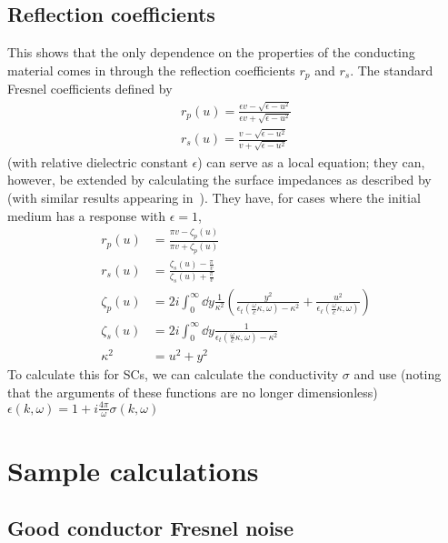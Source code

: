 \documentclass[../main.tex]{subfiles}
\begin{document}
	\subsection{Reflection coefficients} \label{subsec:ReflectionCoeffs}
	This shows that the only dependence on the properties of the conducting material comes in through the reflection coefficients $r_p$ and $r_s$.
	The standard Fresnel coefficients defined by
	\begin{align}
		r_p(u) = \frac{\epsilon v - \sqrt{\epsilon - u^2}}{\epsilon v + \sqrt{\epsilon - u^2}} \\
		r_s(u) = \frac{v - \sqrt{\epsilon - u^2}}{v + \sqrt{\epsilon - u^2}}
	\end{align}
	(with relative dielectric constant $\epsilon$) can serve as a local equation;
	they can, however, be extended by calculating the surface impedances as described by~\cite{Ford1984} (with similar results appearing in~\cite{Nam1967_Part2}).
	They have, for cases where the initial medium has a response with $\epsilon = 1$,
	\begin{align}
		r_p(u) &= \frac{\pi v - \zeta_p(u)}{\pi v + \zeta_p(u)} \\
		r_s(u) &= \frac{\zeta_s(u) - \frac{\pi}{v}}{\zeta_s(u) + \frac{\pi}{v}} \\
		\zeta_p(u) &= 2i \int_0^\infty \dd{y} \frac{1}{\kappa^2} \left( \frac{y^2}{\epsilon_t(\frac{\omega}{c}\kappa, \omega) - \kappa^2} + \frac{u^2}{\epsilon_\ell(\frac{\omega}{c}\kappa, \omega)} \right) \\
		\zeta_s(u) &= 2i \int_0^\infty \dd{y} \frac{1}{\epsilon_t(\frac{\omega}{c}\kappa, \omega) - \kappa^2} \\
		\kappa^2 &= u^2 + y^2
	\end{align}
	To calculate this for SCs, we can calculate the conductivity $\sigma$ and use (noting that the arguments of these functions are no longer dimensionless) $\epsilon(k, \omega) = 1 + i \frac{4 \pi}{\omega} \sigma(k, \omega)$%

	\section{Sample calculations} \label{sec:SampleCalcs}

	\subsection{Good conductor Fresnel noise} \label{subsec:sample:fresnelperfect}
\end{document}
